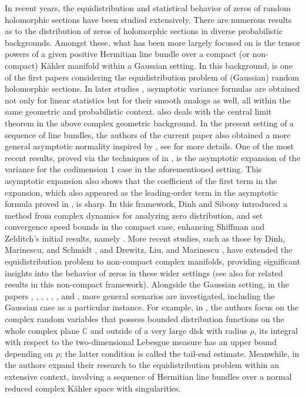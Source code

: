 \documentclass[11pt,leqno,oneside]{amsart}
\numberwithin{equation}{section}
\begin{document}
In recent years, the equidistribution and statistical behavior of zeros of random holomorphic sections have been studied extensively. There are numerous results as to the distribution of zeros of holomorphic sections in diverse probabilistic backgrounds. Amongst these, what has been more largely focused on is the tensor powers of a given positive Hermitian line bundle over a compact (or non-compact) Kähler manifold within a Gaussian setting. In this background, \cite{SZ99} is one of the first papers considering the equidistribution problem of (Gaussian) random holomorphic sections. In later studies \cite{SZ08, SZ10}, asymptotic variance formulas are obtained not only for linear statistics but for their smooth analogs as well, all within the same geometric and probabilistic context. \cite{SZ10} also deals with the central limit theorem in the above complex geometric background. In the present setting of a sequence of line bundles, the authors of the current paper also obtained a more general asymptotic normality inspired by \cite{SZ10}, see \cite{BG1} for more details. One of the most recent results, proved via the techniques of \cite{SZ10} in \cite{Shif1}, is the asymptotic expansion of the variance for the codimension \(1\) case in the aforementioned setting. This asymptotic expansion also shows that the coefficient of the first term in the expansion, which also appeared as the leading-order term in the asymptotic formula proved in \cite{SZ10}, is sharp. In this framework, Dinh and Sibony \cite{DS06} introduced a method from complex dynamics for analyzing zero distribution, and set convergence speed bounds in the compact case, enhancing Shiffman and Zelditch's initial results, namely \cite{SZ99}. More recent studies, such as those by Dinh, Marinescu, and Schmidt \cite{DMS12}, and Drewitz, Liu, and Marinescu \cite{DLM23}, \cite{DLM1} have extended the equidistribution problem to non-compact complex manifolds, providing significant insights into the behavior of zeros in these wider settings (see also \cite{BG24} for related results in this non-compact framework). Alongside the Gaussian setting, in the papers \cite{Bay16}, \cite{BCHM}, \cite{BloomL}, \cite{CLMM}, \cite{CM1}, \cite{CMM}, \cite{G1} and \cite{BCM}, more general scenarios are investigated, including the Gaussian case as a particular instance. For example, in \cite{BloomL}, the authors focus on the complex random variables that possess bounded distribution functions on the whole complex plane \( \mathbb{C} \) and outside of a very large disk with radius \( \rho \), its integral with respect to the two-dimensional Lebesgue measure has an upper bound depending on \( \rho \); the latter condition is called the tail-end estimate. Meanwhile, in \cite{BCM, CMM} the authors expand their research to the equidistribution problem within an extensive context, involving a sequence of Hermitian line bundles over a normal reduced complex Kähler space with singularities.
\end{document}
